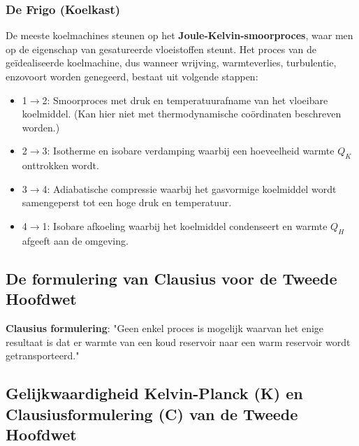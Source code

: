 \subsubsection{De Frigo (Koelkast)}
De meeste koelmachines steunen op het \textbf{Joule-Kelvin-smoorproces}, waar men op de eigenschap van gesatureerde vloeistoffen steunt.
Het proces van de geïdealiseerde koelmachine, dus wanneer wrijving, warmteverlies, turbulentie, enzovoort worden genegeerd, bestaat uit volgende stappen:
\begin{itemize}
    \item 1\(\to\)2: Smoorproces met druk en temperatuurafname van het vloeibare koelmiddel. (Kan hier niet met thermodynamische coördinaten beschreven worden.)
    \item 2\(\to\)3: Isotherme en isobare verdamping waarbij een hoeveelheid warmte \(Q_K\) onttrokken wordt.
    \item 3\(\to\)4: Adiabatische compressie waarbij het gasvormige koelmiddel wordt samengeperst tot een hoge druk en temperatuur.
    \item 4\(\to\)1: Isobare afkoeling waarbij het koelmiddel condenseert en warmte \(Q_H\) afgeeft aan de omgeving.
\end{itemize}

\subsection{De formulering van  Clausius voor de Tweede Hoofdwet}

\begin{postulate}
    \textbf{Clausius formulering}: "Geen enkel proces is mogelijk waarvan het enige resultaat is dat er warmte van een koud reservoir naar een warm reservoir wordt getransporteerd."
\end{postulate}

\subsection{Gelijkwaardigheid Kelvin-Planck (K) en Clausiusformulering (C) van de Tweede Hoofdwet}

